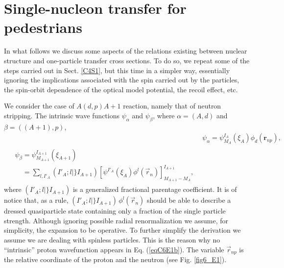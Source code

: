 \section{Single-nucleon transfer for pedestrians}\label{C6AppE}

In what follows we discuss some aspects of the relations existing between nuclear structure and one-particle transfer cross sections. To do so, we repeat some of the steps carried out in Sect. \ref{C4S1}, but this time in a simpler way, essentially ignoring the implications associated with the spin carried out by the particles, the spin-orbit dependence of the optical model potential, the recoil effect, etc.

We consider the case of $A(d,p)A+1$ reaction, namely that of neutron stripping. The intrinsic wave functions $\psi_\alpha$ and $\psi_\beta$, where $\alpha=(A,d)$ and $\beta=((A+1),p)$,
\begin{subequations}
\begin{align}\label{eqC6E1}
&\psi_\alpha=\psi_{M_{A}}^{I_A}(\xi_A) \phi_d(\mathbf r_{np}),\\
\begin{split}\label{eqC6E1b}
&\psi_\beta=\psi_{M_{A+1}}^{I_{A+1}}(\xi_{A+1})\\
& \;\;\;\;=\sum_{l,I'_A} (I'_A;l \vert \} I_{A+1})
[\psi^{I'_A}(\xi_A)\phi^l(\vec r_{n})]_{M_{A+1}-M_A}^{I_{A+1}},
\end{split}
\end{align}
\end{subequations}
where $(I'_A;l \vert \} I_{A+1})$ is a generalized fractional parentage coefficient. It is of notice that, as a rule,  \mbox{$(I'_A;l \vert \} I_{A+1})\,\phi^l(\vec r_{n})$} should be able to describe a dressed quasiparticle state containing only a fraction of the  single particle strength. Although ignoring possible radial renormalization we assume, for simplicity, the expansion to be operative.	
To further simplify the derivation we assume we are dealing with spinless particles. This is the reason why no ``intrinsic'' proton wavefunction appears in Eq. (\ref{eqC6E1b}). The variable $\vec r_{np}$ is the relative coordinate of the proton and the neutron (see Fig. \ref{fig6_E1}).


